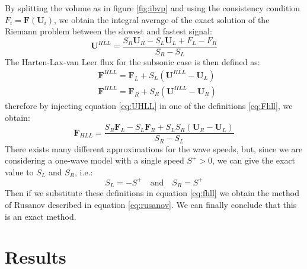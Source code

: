 \documentclass[12pt,a4paper]{article}
\numberwithin{equation}{section}
\begin{document}
\noindent
By splitting the volume as in figure \ref{fig:ibvp} and using the consistency condition $F_i = \boldsymbol{F}(\boldsymbol{U}_i)$, we obtain the integral average of the exact solution of the Riemann problem between the slowest and fastest signal:
\begin{equation}\label{eq:UHLL}
\boldsymbol{U}^{HLL} = \frac{S_R \boldsymbol{U}_R - S_L \boldsymbol{U}_L + F_L - F_R}{S_R - S_L}
\end{equation}
The Harten-Lax-van Leer flux for the subsonic case is then defined as:
\begin{equation}\label{eq:Fhll}
\begin{aligned}
& \boldsymbol{F}^{HLL} = \boldsymbol{F}_L + S_L(\boldsymbol{U}^{HLL} - \boldsymbol{U}_L)\\
& \boldsymbol{F}^{HLL} = \boldsymbol{F}_R + S_R(\boldsymbol{U}^{HLL} - \boldsymbol{U}_R)
\end{aligned}
\end{equation}
therefore by injecting equation \ref{eq:UHLL} in one of the definitions \ref{eq:Fhll}, we obtain:
\begin{equation}\label{eq:fhll}
\boldsymbol{F}_{HLL} = \frac{S_R\boldsymbol{F}_L - S_L \boldsymbol{F}_R +S_L S_R (\boldsymbol{U}_R -\boldsymbol{U}_L)}{S_R-S_L}
\end{equation}
There exists many different approximations for the wave speeds, but, since we are considering a one-wave model with a single speed $S^+ > 0$, we can give the exact value to $S_L$ and $S_R$, i.e.: 
\begin{equation*}
S_L = -S^+ \quad \textrm{and} \quad S_R = S^+
\end{equation*}
Then if we substitute these definitions in equation \ref{eq:fhll} we obtain the method of Rusanov described in equation \ref{eq:rusanov}. We can finally conclude that this is an exact method.
\newpage
\section{Results}
\end{document}
